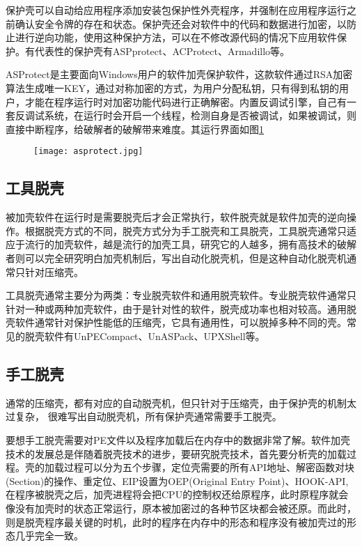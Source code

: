 保护壳可以自动给应用程序添加安装包保护性外壳程序，并强制在应用程序运行之前确认安全令牌的存在和状态。保护壳还会对软件中的代码和数据进行加密，以防止进行逆向功能，使用这种保护方法，可以在不修改源代码的情况下应用软件保护。有代表性的保护壳有ASPprotect、ACProtect、Armadillo等。

ASProtect是主要面向Windows用户的软件加壳保护软件，这款软件通过RSA加密算法生成唯一KEY，通过对称加密的方式，为用户分配私钥，只有得到私钥的用户，才能在程序运行时对加密功能代码进行正确解密。内置反调试引擎，自己有一套反调试系统，在运行时会开启一个线程，检测自身是否被调试，如果被调试，则直接中断程序，给破解者的破解带来难度。其运行界面如图\ref{sec2:subsec3:asprotect}

\begin{figure}[htbp]
	\centering
	\texttt{[image: asprotect.jpg]}\\
	\label{sec2:subsec3:asprotect}
\end{figure}

\subsection{工具脱壳}

被加壳软件在运行时是需要脱壳后才会正常执行，软件脱壳就是软件加壳的逆向操作。根据脱壳方式的不同，脱壳方式分为手工脱壳和工具脱壳，工具脱壳通常只适应于流行的加壳软件，越是流行的加壳工具，研究它的人越多，拥有高技术的破解者则可以完全研究明白加壳机制后，写出自动化脱壳机，但是这种自动化脱壳机通常只针对压缩壳。

工具脱壳通常主要分为两类：专业脱壳软件和通用脱壳软件。专业脱壳软件通常只针对一种或两种加壳软件，由于是针对性的软件，脱壳成功率也相对较高。通用脱壳软件通常针对保护性能低的压缩壳，它具有通用性，可以脱掉多种不同的壳。常见的脱壳软件有UnPECompact、UnASPack、UPXShell等。

\subsection{手工脱壳}

通常的压缩壳，都有对应的自动脱壳机，但只针对于压缩壳，由于保护壳的机制太过复杂，
很难写出自动脱壳机，所有保护壳通常需要手工脱壳。

要想手工脱壳需要对PE文件以及程序加载后在内存中的数据非常了解。软件加壳技术的发展总是伴随着脱壳技术的进步，要研究脱壳技术，首先要分析壳的加载过程。壳的加载过程可以分为五个步骤，定位壳需要的所有API地址、解密函数对块(Section)的操作、重定位、EIP设置为OEP(Original Entry Point)、HOOK-API,在程序被脱壳之后，加壳进程将会把CPU的控制权还给原程序，此时原程序就会像没有加壳时的状态正常运行，原本被加密过的各种节区块都会被还原。而此时，则是脱壳程序最关键的时机，此时的程序在内存中的形态和程序没有被加壳过的形态几乎完全一致\cite{2018Method}。

